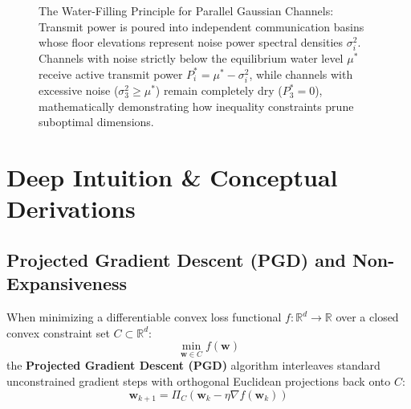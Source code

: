 \begin{figure}[htbp]
\caption{The Water-Filling Principle for Parallel Gaussian Channels: Transmit power is poured into independent communication basins whose floor elevations represent noise power spectral densities $\sigma_i^2$. Channels with noise strictly below the equilibrium water level $\mu^*$ receive active transmit power $P_i^* = \mu^* - \sigma_i^2$, while channels with excessive noise ($\sigma_3^2 \ge \mu^*$) remain completely dry ($P_3^* = 0$), mathematically demonstrating how inequality constraints prune suboptimal dimensions.}
\label{fig:waterfilling_geometry}
\end{figure}

\section{Deep Intuition \& Conceptual Derivations}

\subsection{Projected Gradient Descent (PGD) and Non-Expansiveness}
When minimizing a differentiable convex loss functional $f: \mathbb{R}^d \to \mathbb{R}$ over a closed convex constraint set $C \subset \mathbb{R}^d$:
\begin{equation}
\min_{\mathbf{w} \in C} f(\mathbf{w})
\end{equation}
the \textbf{Projected Gradient Descent (PGD)} algorithm interleaves standard unconstrained gradient steps with orthogonal Euclidean projections back onto $C$:
\begin{equation}
\mathbf{w}_{k+1} = \Pi_C\left( \mathbf{w}_k - \eta \nabla f(\mathbf{w}_k) \right)
\label{eq:pgd_update}
\end{equation}

